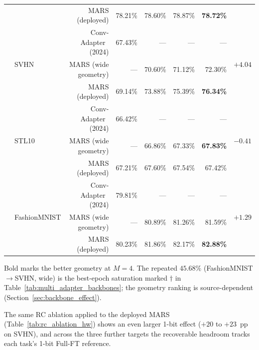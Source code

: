 \documentclass[12pt, a4paper]{report}
\numberwithin{equation}{chapter}
\numberwithin{figure}{chapter}
\numberwithin{table}{chapter}
\numberwithin{algorithm}{chapter}
\begin{document}
\begin{table}[H]
\begin{tabular}{llrrrrrc}
 & & MARS (deployed) & 78.21\% & 78.60\% & 78.87\% & \textbf{78.72\%} & \\
\cmidrule(lr){2-8}
 & \multirow{3}{*}{SVHN} & Conv-Adapter~\cite{Chen2024ConvAdapter} (2024) & 67.43\% & --- & --- & --- & \multirow{3}{*}{$+4.04$} \\
 & & MARS (wide geometry) & --- & 70.60\% & 71.12\% & 72.30\% & \\
 & & MARS (deployed) & 69.14\% & 73.88\% & 75.39\% & \textbf{76.34\%} & \\
\cmidrule(lr){2-8}
 & \multirow{3}{*}{STL10} & Conv-Adapter~\cite{Chen2024ConvAdapter} (2024) & 66.42\% & --- & --- & --- & \multirow{3}{*}{$-0.41$} \\
 & & MARS (wide geometry) & --- & 66.86\% & 67.33\% & \textbf{67.83\%} & \\
 & & MARS (deployed) & 67.21\% & 67.60\% & 67.54\% & 67.42\% & \\
\cmidrule(lr){2-8}
 & \multirow{3}{*}{FashionMNIST} & Conv-Adapter~\cite{Chen2024ConvAdapter} (2024) & 79.81\% & --- & --- & --- & \multirow{3}{*}{$+1.29$} \\
 & & MARS (wide geometry) & --- & 80.89\% & 81.26\% & 81.59\% & \\
 & & MARS (deployed) & 80.23\% & 81.86\% & 82.17\% & \textbf{82.88\%} & \\
\bottomrule
\end{tabular}
\begin{flushleft}
\footnotesize Bold marks the better geometry at $M{=}4$. The repeated $45.68\%$ (FashionMNIST$\to$SVHN, wide) is the best-epoch saturation marked $\dagger$ in Table~\ref{tab:multi_adapter_backbones}; the geometry ranking is source-dependent (Section~\ref{sec:backbone_effect}).
\end{flushleft}
\end{table}

The same RC ablation applied to the deployed MARS (Table~\ref{tab:rc_ablation_hw}) shows an even larger 1-bit effect ($+20$ to $+23$~pp on SVHN), and across the three further targets the recoverable headroom tracks each task's 1-bit Full-FT reference.
\end{document}
